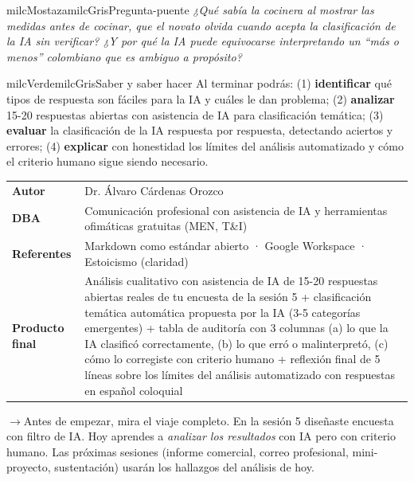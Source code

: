 \documentclass[11pt,letterpaper]{article}
\newcommand{\puente}[1]{%
  \begin{puentebox}%
    \textcolor{milcGradeDark}{$\rightarrow$}\hspace{2mm}#1%
  \end{puentebox}%
}
\begin{document}
\begin{softbox}{milcMostaza}{milcGris}{Pregunta-puente}
\textit{¿Qué sabía la cocinera al mostrar las medidas antes de cocinar, que el novato olvida cuando acepta la clasificación de la IA sin verificar? ¿Y por qué la IA puede equivocarse interpretando un \emph{``más o menos''} colombiano que es ambiguo a propósito?}
\end{softbox}

\begin{softbox}{milcVerde}{milcGris}{Saber y saber hacer}
Al terminar podrás: (1) \textbf{identificar} qué tipos de respuesta son fáciles para la IA y cuáles le dan problema; (2) \textbf{analizar} 15-20 respuestas abiertas con asistencia de IA para clasificación temática; (3) \textbf{evaluar} la clasificación de la IA respuesta por respuesta, detectando aciertos y errores; (4) \textbf{explicar} con honestidad los límites del análisis automatizado y cómo el criterio humano sigue siendo necesario.
\end{softbox}



\small
\begin{tabularx}{\textwidth}{>{\bfseries}p{3.0cm}Y}
Autor & Dr. Álvaro Cárdenas Orozco\\
DBA & Comunicación profesional con asistencia de IA y herramientas ofimáticas gratuitas (MEN, T\&I)\\
Referentes & Markdown como estándar abierto · Google Workspace · Estoicismo (claridad)\\
Producto final & Análisis cualitativo con asistencia de IA de 15-20 respuestas abiertas reales de tu encuesta de la sesión 5 + clasificación temática automática propuesta por la IA (3-5 categorías emergentes) + tabla de auditoría con 3 columnas (a) lo que la IA clasificó correctamente, (b) lo que erró o malinterpretó, (c) cómo lo corregiste con criterio humano + reflexión final de 5 líneas sobre los límites del análisis automatizado con respuestas en español coloquial\\
\end{tabularx}
\normalsize

\puente{Antes de empezar, mira el viaje completo. En la sesión 5 diseñaste encuesta con filtro de IA. Hoy aprendes a \emph{analizar los resultados} con IA pero con criterio humano. Las próximas sesiones (informe comercial, correo profesional, mini-proyecto, sustentación) usarán los hallazgos del análisis de hoy.}
\end{document}
